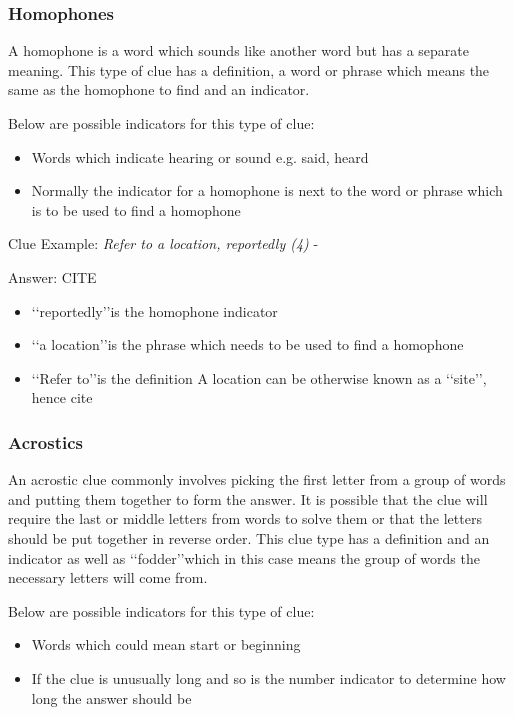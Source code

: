 \subsubsection{Homophones}

A homophone is a word which sounds like another word but has a separate meaning. This type of clue has a definition, a word or phrase which means the same as the homophone to find and an indicator. 

Below are possible indicators for this type of clue:
\begin{itemize} 
	\item Words which indicate hearing or sound e.g. said, heard 
	\item Normally the indicator for a homophone is next to the word or phrase which is to be used to find a homophone  
\\
\end{itemize}

Clue Example: \emph{Refer to a location, reportedly (4)} - \citep{shuchiHomophone08}

Answer: CITE 

\begin{itemize}
	\item \lq\lq reportedly\rq\rq is the homophone indicator 
	\item \lq\lq a location\rq\rq is the phrase which needs to be used to find a homophone 
	\item\lq\lq Refer to\rq\rq is the definition 
	A location can be otherwise known as a \lq\lq site\rq\rq, hence cite 
\end{itemize}

\subsubsection{Acrostics}

An acrostic clue commonly involves picking the first letter from a group of words and putting them together to form the answer. It is possible that the clue will require the last or middle letters from words to solve them or that the letters should be put together in reverse order. This clue type has a definition and an indicator as well as \lq\lq fodder\rq\rq which in this case means the group of words the necessary letters will come from. 

Below are possible indicators for this type of clue:
\begin{itemize}
 	\item Words which could mean start or beginning 
	\item If the clue is unusually long and so is the number indicator to determine how long the answer should be 
\\
\end{itemize}

